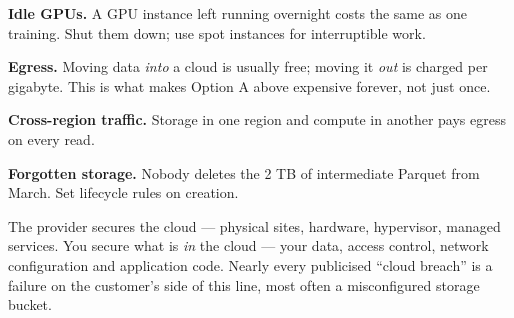 \begin{alertbox}
\begin{tight}
  \item \textbf{Idle GPUs.} A GPU instance left running overnight costs the same as
        one training. Shut them down; use spot instances for interruptible work.
  \item \textbf{Egress.} Moving data \emph{into} a cloud is usually free; moving it
        \emph{out} is charged per gigabyte. This is what makes Option A above
        expensive forever, not just once.
  \item \textbf{Cross-region traffic.} Storage in one region and compute in another
        pays egress on every read.
  \item \textbf{Forgotten storage.} Nobody deletes the 2 TB of intermediate
        Parquet from March. Set lifecycle rules on creation.
\end{tight}
\end{alertbox}

\begin{definitionbox}
The provider secures the cloud --- physical sites, hardware, hypervisor, managed
services. You secure what is \emph{in} the cloud --- your data, access control,
network configuration and application code. Nearly every publicised ``cloud breach''
is a failure on the customer's side of this line, most often a misconfigured storage
bucket.
\end{definitionbox}

